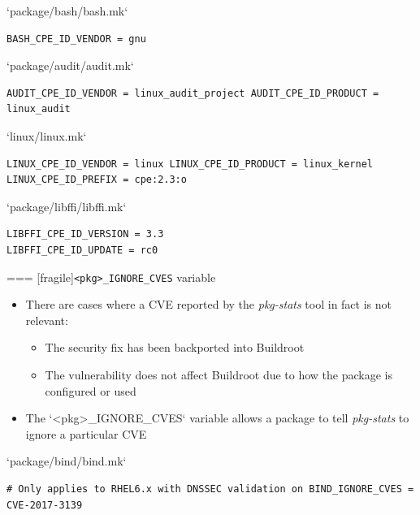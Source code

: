   \begin{block}{`package/bash/bash.mk`}
\begin{verbatim}
BASH_CPE_ID_VENDOR = gnu
\end{verbatim}
  \end{block}

  \begin{block}{`package/audit/audit.mk`}
\begin{verbatim}
AUDIT_CPE_ID_VENDOR = linux_audit_project AUDIT_CPE_ID_PRODUCT = linux_audit
\end{verbatim}
  \end{block}

  \begin{block}{`linux/linux.mk`}
\begin{verbatim}
LINUX_CPE_ID_VENDOR = linux LINUX_CPE_ID_PRODUCT = linux_kernel LINUX_CPE_ID_PREFIX = cpe:2.3:o
\end{verbatim}
  \end{block}

  \begin{block}{`package/libffi/libffi.mk`}
\begin{verbatim}
LIBFFI_CPE_ID_VERSION = 3.3
LIBFFI_CPE_ID_UPDATE = rc0
\end{verbatim}
  \end{block}



=== [fragile]{{\tt <pkg>\_IGNORE\_CVES} variable}

  \begin{itemize}
  \item There are cases where a CVE reported by the {\em pkg-stats}
    tool in fact is not relevant:
    \begin{itemize}
    \item The security fix has been backported into Buildroot
    \item The vulnerability does not affect Buildroot due to how the
      package is configured or used
    \end{itemize}
  \item The `<pkg>_IGNORE_CVES` variable allows a package to tell
    {\em pkg-stats} to ignore a particular CVE
  \end{itemize}

  \begin{block}{`package/bind/bind.mk`}
\begin{verbatim}
# Only applies to RHEL6.x with DNSSEC validation on BIND_IGNORE_CVES = CVE-2017-3139
\end{verbatim}
  \end{block}

